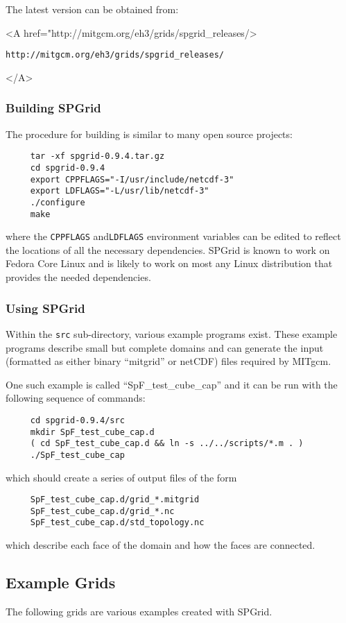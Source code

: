 The latest version can be obtained from:
\begin{center}
  \begin{rawhtml} <A href="http://mitgcm.org/eh3/grids/spgrid_releases/>
  \end{rawhtml}
  \texttt{http://mitgcm.org/eh3/grids/spgrid\_releases/}
  \begin{rawhtml} </A> \end{rawhtml}
\end{center}


\subsubsection{Building SPGrid}

The procedure for building is similar to many open source projects:
\begin{verbatim}
     tar -xf spgrid-0.9.4.tar.gz
     cd spgrid-0.9.4
     export CPPFLAGS="-I/usr/include/netcdf-3"
     export LDFLAGS="-L/usr/lib/netcdf-3"
     ./configure
     make
\end{verbatim}
where the \texttt{CPPFLAGS} and\texttt{LDFLAGS} environment variables
can be edited to reflect the locations of all the necessary
dependencies.  SPGrid is known to work on Fedora Core Linux and is
likely to work on most any Linux distribution that provides the needed
dependencies.


\subsubsection{Using SPGrid}

Within the \texttt{src} sub-directory, various example programs
exist.  These example programs describe small but complete domains and
can generate the input (formatted as either binary ``mitgrid'' or
netCDF) files required by MITgcm.

One such example is called ``SpF\_test\_cube\_cap'' and it can be run
with the following sequence of commands:
\begin{verbatim}
     cd spgrid-0.9.4/src
     mkdir SpF_test_cube_cap.d
     ( cd SpF_test_cube_cap.d && ln -s ../../scripts/*.m . )
     ./SpF_test_cube_cap
\end{verbatim}
which should create a series of output files of the form
\begin{verbatim}
     SpF_test_cube_cap.d/grid_*.mitgrid
     SpF_test_cube_cap.d/grid_*.nc
     SpF_test_cube_cap.d/std_topology.nc
\end{verbatim}
which describe each face of the domain and how the faces are
connected.


\subsection{Example Grids}

The following grids are various examples created with SPGrid. 
